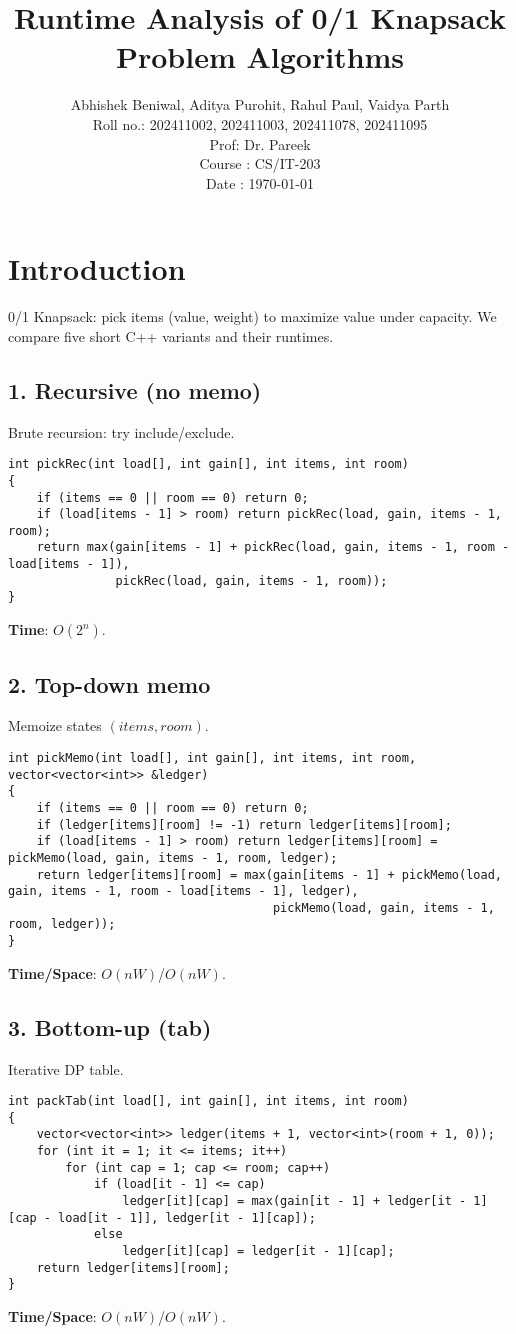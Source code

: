 \documentclass[12pt]{article}
\title{Runtime Analysis of 0/1 Knapsack Problem Algorithms}\\
\author{Abhishek Beniwal, Aditya Purohit, Rahul Paul, Vaidya Parth \\
\small{Roll no.: 202411002, 202411003, 202411078, 202411095} \\
\small{Prof: Dr. Pareek} \\
\small{Course : CS/IT-203} \\
\small{Date : \today}}\\
\date{}
\begin{document}
\maketitle
\newpage

\section{Introduction}
0/1 Knapsack: pick items (value, weight) to maximize value under capacity. We compare five short C++ variants and their runtimes.

\subsection*{1. Recursive (no memo)}
Brute recursion: try include/exclude.
\begin{lstlisting}
int pickRec(int load[], int gain[], int items, int room)
{
    if (items == 0 || room == 0) return 0;
    if (load[items - 1] > room) return pickRec(load, gain, items - 1, room);
    return max(gain[items - 1] + pickRec(load, gain, items - 1, room - load[items - 1]),
               pickRec(load, gain, items - 1, room));
}
\end{lstlisting}
\textbf{Time}: $O(2^n)$.

\subsection*{2. Top-down memo}
Memoize states \((items, room)\).
\begin{lstlisting}
int pickMemo(int load[], int gain[], int items, int room, vector<vector<int>> &ledger)
{
    if (items == 0 || room == 0) return 0;
    if (ledger[items][room] != -1) return ledger[items][room];
    if (load[items - 1] > room) return ledger[items][room] = pickMemo(load, gain, items - 1, room, ledger);
    return ledger[items][room] = max(gain[items - 1] + pickMemo(load, gain, items - 1, room - load[items - 1], ledger),
                                     pickMemo(load, gain, items - 1, room, ledger));
}
\end{lstlisting}
\textbf{Time/Space}: $O(nW)$/$O(nW)$.

\subsection*{3. Bottom-up (tab)}
Iterative DP table.
\begin{lstlisting}
int packTab(int load[], int gain[], int items, int room)
{
    vector<vector<int>> ledger(items + 1, vector<int>(room + 1, 0));
    for (int it = 1; it <= items; it++)
        for (int cap = 1; cap <= room; cap++)
            if (load[it - 1] <= cap)
                ledger[it][cap] = max(gain[it - 1] + ledger[it - 1][cap - load[it - 1]], ledger[it - 1][cap]);
            else
                ledger[it][cap] = ledger[it - 1][cap];
    return ledger[items][room];
}
\end{lstlisting}
\textbf{Time/Space}: $O(nW)$/$O(nW)$.
\end{document}
